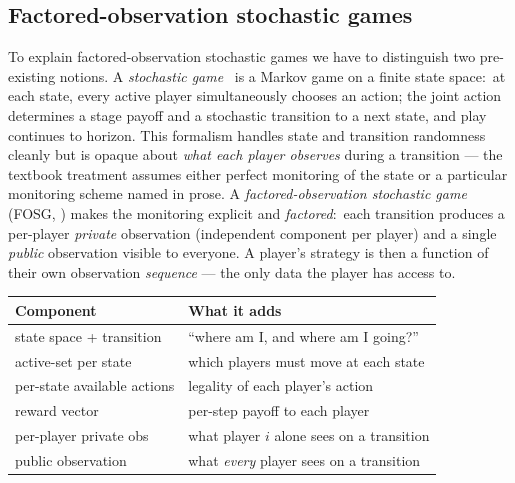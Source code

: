 
\subsection{Factored-observation stochastic games}
\label{sec:languages:fosg}

To explain factored-observation stochastic games we have to
distinguish two pre-existing notions.  A \emph{stochastic
game}~\citep{Shapley1953stochastic} is a Markov game on a finite
state space:\ at each state, every active player simultaneously
chooses an action; the joint action determines a stage payoff and
a stochastic transition to a next state, and play continues to
horizon.  This formalism handles state and transition randomness
cleanly but is opaque about \emph{what each player observes}
during a transition — the textbook treatment assumes either
perfect monitoring of the state or a particular monitoring scheme
named in prose.  A \emph{factored-observation stochastic game}
(FOSG, \citealp{Kovarik2022}) makes the monitoring explicit and
\emph{factored}:\ each transition produces a per-player
\emph{private} observation (independent component per player) and
a single \emph{public} observation visible to everyone.  A player's
strategy is then a function of their own observation \emph{sequence}
— the only data the player has access to.

\begin{center}\small
\begin{tabular}{@{}lp{}@{}}
\toprule
Component & What it adds \\
\midrule
state space + transition & ``where am I, and where am I going?'' \\
active-set per state & which players must move at each state \\
per-state available actions & legality of each player's action \\
reward vector & per-step payoff to each player \\
per-player private obs & what player $i$ alone sees on a transition \\
public observation & what \emph{every} player sees on a transition \\
\bottomrule
\end{tabular}
\end{center}

